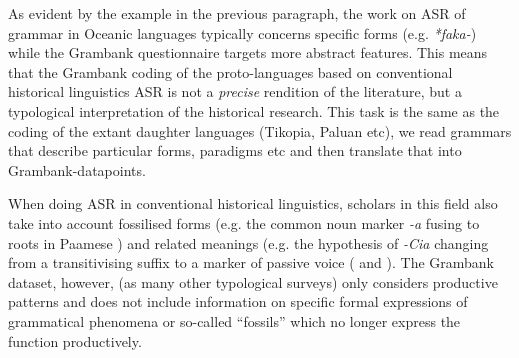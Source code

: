 \documentclass[12pt,letterpaper]{article}
\begin{document}



As evident by the example in the previous paragraph, the work on ASR of grammar in Oceanic languages typically concerns specific forms (e.g. \emph{*faka-}) while the Grambank questionnaire targets more abstract features. This means that the Grambank coding of the proto-languages based on conventional historical linguistics ASR is not a \emph{precise} rendition of the literature, but a typological interpretation of the historical research. This task is the same as the coding of the extant daughter languages (Tikopia, Paluan etc), we read grammars that describe particular forms, paradigms etc and then translate that into Grambank-datapoints. 

When doing ASR in conventional historical linguistics, scholars in this field also take into account fossilised forms (e.g. the common noun marker \emph{-a} fusing to roots in Paamese \citep[141]{crowley1985common}) and related meanings (e.g. the hypothesis of \emph{-Cia} changing from a transitivising suffix to a marker of passive voice (\citet{hale_1968, hohepa_1967, hohepa_1969, chung1978} and \citet{jonsson1998}). The Grambank dataset, however, (as many other typological surveys) only considers productive patterns and does not include information on specific formal expressions of grammatical phenomena or so-called ``fossils'' which no longer express the function productively.
\end{document}
